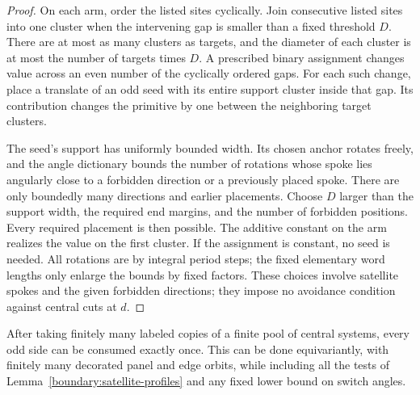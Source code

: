 \begin{proof}
On each arm, order the listed sites cyclically. Join consecutive listed
sites into one cluster when the intervening gap is smaller than a fixed
threshold $D$. There are at most as many clusters as targets, and the
diameter of each cluster is at most the number of targets times $D$. A
prescribed binary assignment changes value across an even number of the
cyclically ordered gaps. For each such change, place a translate of an odd
seed with its entire support cluster inside that gap. Its contribution
changes the primitive by one between the neighboring target clusters.

The seed's support has uniformly bounded width. Its chosen anchor rotates
freely, and the angle dictionary bounds the number of rotations whose spoke
lies angularly close to a forbidden direction or a previously placed
spoke. There are only boundedly many directions and earlier placements.
Choose $D$ larger than the support width, the required end margins, and the
number of forbidden positions. Every required placement is then possible.
The additive constant on the arm realizes the value on the first cluster.
If the assignment is constant, no seed is needed. All rotations are by
integral period steps; the fixed elementary word lengths only enlarge the
bounds by fixed factors. These choices involve satellite spokes and the
given forbidden directions; they impose no avoidance condition against
central cuts at $d$.
\end{proof}

\begin{lemma}\label{boundary:consumption}
After taking finitely many labeled copies of a finite pool of central
systems, every odd side can be consumed exactly once. This can be done
equivariantly, with finitely many decorated panel and edge orbits, while
including all the tests of Lemma~\ref{boundary:satellite-profiles} and any
fixed lower bound on switch angles.
\end{lemma}

